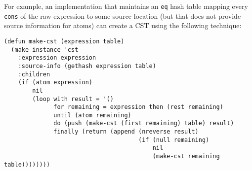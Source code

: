For example, an implementation that maintains an \texttt{eq} hash
table mapping every \texttt{cons} of the raw expression to some source
location (but that does not provide source information for atoms) can
create a CST using the following technique:

{\small\begin{verbatim}
(defun make-cst (expression table)
  (make-instance 'cst
    :expression expression
    :source-info (gethash expression table)
    :children
    (if (atom expression)
        nil
        (loop with result = '()
              for remaining = expression then (rest remaining)
              until (atom remaining)
              do (push (make-cst (first remaining) table) result)
              finally (return (append (nreverse result)
                                      (if (null remaining)
                                          nil
                                          (make-cst remaining table))))))))
\end{verbatim}}








